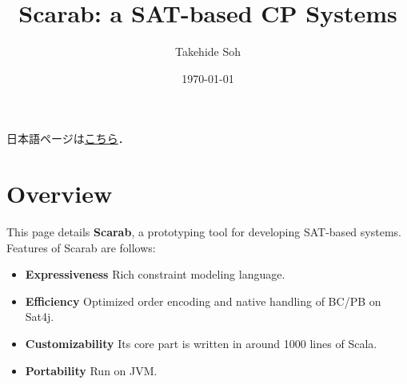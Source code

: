 \documentclass[11pt]{article}
\author{Takehide Soh}
\date{\today}
\title{Scarab: a SAT-based CP Systems}
\begin{document}
\maketitle
日本語ページは\href{./jp/index.html}{こちら}．

\section*{Overview}
\label{sec-1}
This page details \textbf{Scarab}, a prototyping tool for developing SAT-based systems. 
Features of Scarab are follows:

\begin{itemize}
\item \textbf{Expressiveness} Rich constraint modeling language.
\item \textbf{Efficiency} Optimized order encoding and native handling of BC/PB on Sat4j.
\item \textbf{Customizability} Its core part is written in around 1000 lines of Scala.
\item \textbf{Portability} Run on JVM.
\end{itemize}
\end{document}
